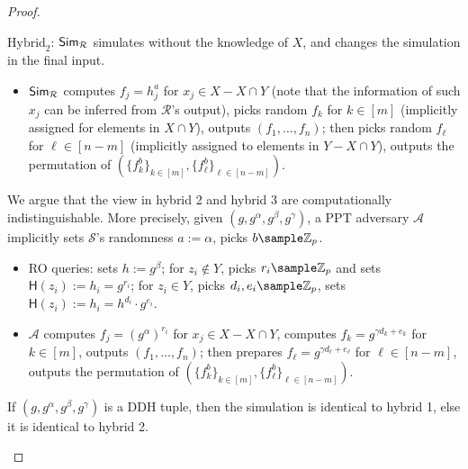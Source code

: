\begin{proof}
\begin{trivlist}
\item $\text{Hybrid}_2$: $\mathsf{Sim}_\mathcal{R}$ simulates without the knowledge of $X$, 
    and changes the simulation in the final input.  
\begin{itemize}
    \item $\mathsf{Sim}_\mathcal{R}$ computes $f_j = h_j^{a}$ for $x_j \in X - X \cap Y$ (note that the information of such $x_j$ 
        can be inferred from $\mathcal{R}$'s output), picks random $f_k$ for $k \in [m]$ 
        (implicitly assigned for elements in $X \cap Y$), outputs $(f_1, \dots, f_n)$; 
        then picks random $f_\ell$ for $\ell \in [n-m]$ (implicitly assigned to elements in $Y - X \cap Y$), 
        outputs the permutation of $(\{f_k^b\}_{k \in [m]}, \{f_\ell^b\}_{\ell \in [n-m]})$.        
\end{itemize}
We argue that the view in hybrid 2 and hybrid 3 are computationally indistinguishable. 
More precisely, given $(g, g^\alpha, g^\beta, g^\gamma)$, 
a PPT adversary $\mathcal{A}$  
implicitly sets $\mathcal{S}$'s randomness $a:=\alpha$, picks $b \sample \mathbb{Z}_p$. 
\begin{itemize}
    \item RO queries: sets $h := g^\beta$; 
        for $z_i \notin Y$, picks $r_i \sample \mathbb{Z}_p$ and sets $\mathsf{H}(z_i):= h_i = g^{r_i}$; 
        for $z_i \in Y$, 
        picks $d_i, e_i \sample \mathbb{Z}_p$, sets $\mathsf{H}(z_i):= h_i = h^{d_i} \cdot g^{e_i}$.  

    \item $\mathcal{A}$ computes $f_j = (g^\alpha)^{r_i}$ for $x_j \in X - X \cap Y$, 
        computes $f_k = g^{\gamma d_k + e_k}$ for $k \in [m]$, outputs $(f_1, \dots, f_n)$; 
        then prepares $f_\ell = g^{\gamma d_\ell + e_\ell}$ for $\ell \in [n-m]$, 
        outputs the permutation of $(\{f_k^b\}_{k \in [m]}, \{f_\ell^b\}_{\ell \in [n-m]})$.          
\end{itemize}

If $(g, g^\alpha, g^\beta, g^\gamma)$ is a DDH tuple, then the simulation is identical to hybrid 1, 
else it is identical to hybrid 2. 
\end{trivlist}
\end{proof}





